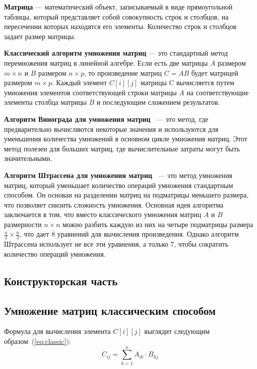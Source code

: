 \documentclass[12pt, a4paper]{article}
\begin{document}
\textbf{Матрица} --- математический объект, записываемый в виде прямоугольной таблицы, который представляет собой совокупность строк и столбцов, на пересечении которых находятся его элементы. Количество строк и столбцов задает размер матрицы.

\textbf{Классический алгоритм умножения матриц} --- это стандартный метод перемножения матриц в линейной алгебре. Если есть две матрицы $A$ размером $m \times n$ и $B$ размером $n \times p$, то произведение матриц $C = AB$ будет матрицей размером $m \times p$. Каждый элемент $C[i][j]$ матрицы C вычисляется путем умножения элементов соответствующей строки матрицы $A$ на соответствующие элементы столбца матрицы $B$ и последующим сложением результатов. 

\textbf{Алгоритм Винограда для умножения матриц}~\cite{book} --- это метод, где предварительно вычисляются некоторые значения и используются для уменьшения количества умножений в основном цикле умножения матриц. Этот метод полезен для больших матриц, где вычислительные затраты могут быть значительными. 

\textbf{Алгоритм Штрассена для умножения матриц}~\cite{book} --- это метод умножения матриц, который уменьшает количество операций умножения стандартным способом. Он основан на разделении матриц на подматрицы меньшего размера, что позволяет снизить сложность умножения. Основная идея алгоритма заключается в том, что вместо классического умножения матриц $A$ и $B$ размерности $n \times n$ можно разбить каждую из них на четыре подматрицы размера $\frac{n}{2} \times \frac{n}{2}$, что дает $8$ уравнений для вычисления произведения. Однако алгоритм Штрассена использует не все эти уравнения, а только $7$, чтобы сократить количество операций умножения.

\newpage
\begin{center}
    \section{Конструкторская часть}
\end{center}
\subsection{Умножение матриц классическим способом}
Формула для вычисления элемента $C[i][j]$ выглядит следующим образом~(\ref{eq:classic}):
\begin{equation} \label{eq:classic}
C_{ij} = \sum_{k=1}^{n} A_{ik} \cdot B_{kj}
\end{equation}
\end{document}
